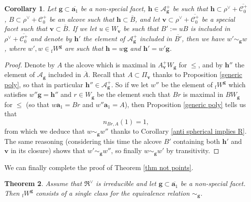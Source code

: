 \documentclass[11pt]{amsart}
\theoremstyle{plain}
\newtheorem{thm}{Theorem}[section]
\newtheorem{coro}[thm]{Corollary}
\theoremstyle{remark}
\numberwithin{equation}{section}
\begin{document}
	\begin{coro}\label{coro periodic}	
		Let $\mathbf{g}\subset\overline{\mathbf{a}_1}$ be a non-special facet, $\mathbf{h}\in\mathcal{A}^+_\mathbf{g}$ be such that $\mathbf{h}\subset\rho^\vee+\overline{\mathscr{C}^+_0}$, $B\subset\rho^\vee+\mathscr{C}^+_0$ be an alcove such that $\mathbf{h}\subset\overline{B}$, and let $\mathbf{v}\subset\rho^\vee+\overline{\mathscr{C}^+_0}$ be a special facet such that $\mathbf{v}\subset\overline{B}$. If we let $u\in W_\mathbf{v}$ be such that $B':=uB$ is included in $\rho^\vee+\overline{\mathscr{C}^+_0}$ and denote by $\mathbf{h}'$ the element of $\mathcal{A}^+_\mathbf{g}$ included in $\overline{B'}$, then we have $w'\sim_\mathbf{g}w$, where $w',w\in {_\mathrm{f}W}^\mathbf{g}$ are such that $\mathbf{h}=w\mathbf{g}$ and $\mathbf{h}'=w'\mathbf{g}$.
	\end{coro}
	\begin{proof}
		Denote by $A$ the alcove which is maximal in $A^+_\mathbf{v}W_\mathbf{g}$ for $\leq$, and by $\mathbf{h}''$ the element of $\mathcal{A}_\mathbf{g}$ included in $\overline{A}$. Recall that $A\subset \Pi_\mathbf{v}$ thanks to Proposition \ref{generic poly}, so that in particular $\mathbf{h}''\in\mathcal{A}^+_\mathbf{g}$. So if we let $w''$ be the element of ${_\mathrm{f}W}^\mathbf{g}$ which satisfies $w''\mathbf{g}=\mathbf{h}''$ and $r\in W_\mathbf{g}$ be the element such that $Br$ is maximal in $BW_\mathbf{g}$ for $\leq$ (so that $w\mathbf{a}_1=Br$ and $w''\mathbf{a}_1=A$), then Proposition \ref{generic poly} tells us that 
		$$n_{Br,A}(1)=1,$$
		from which we deduce that $w\sim_\mathbf{g} w''$ thanks to Corollary \ref{anti spherical implies R}. The same reasoning (considering this time the alcove $B'$  containing both $\mathbf{h}'$ and $\mathbf{v}$ in its closure) shows that $w'\sim_\mathbf{g} w''$, so finally $w\sim_\mathbf{g}w'$ by transitivity.
	\end{proof}
	We can finally complete the proof of Theorem \ref{thm not points}.
	\begin{thm}\label{cas general}
		Assume that $\mathfrak{R}^\vee$ is irreducible and let $\mathbf{g}\subset\overline{\mathbf{a}_1}$ be a non-special facet. Then ${_\mathrm{f}W}^\mathbf{g}$ consists of a single class for the equivalence relation $\sim_{\mathbf{g}}$.
	\end{thm}
\end{document}
